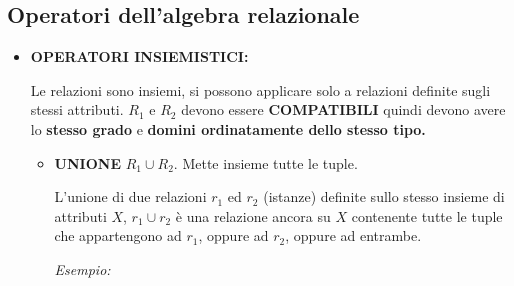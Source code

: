 \documentclass{article}
\begin{document}
\subsection{Operatori dell'algebra relazionale}
\begin{itemize}
    \item \textbf{OPERATORI INSIEMISTICI:}

    Le relazioni sono insiemi, si possono applicare solo a relazioni definite sugli stessi attributi. $R_1$ e $R_2$ devono essere \textbf{COMPATIBILI} quindi devono avere lo \textbf{stesso grado} e \textbf{domini ordinatamente dello stesso tipo.}
    
    \begin{itemize}
        \item \textbf{UNIONE} $R_1 \cup R_2$. Mette insieme tutte le tuple. 
        
        L'unione di due relazioni $r_1$ ed $r_2$ (istanze) definite sullo stesso insieme di attributi $X$, $r_1 \cup r_2$ è una relazione ancora su $X$ contenente tutte le tuple che appartengono ad $r_1$, oppure ad $r_2$, oppure ad entrambe.

        \textit{Esempio:}


\end{itemize}
\end{itemize}
\end{document}
